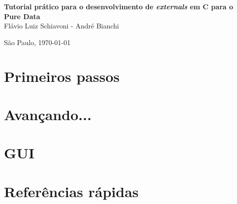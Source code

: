 \documentclass[10pt,a4paper]{report}
\newcommand{\externals}{\emph{externals}\xspace}
\begin{document}
\thispagestyle{empty}
\begin{center}
    \vspace*{2.3cm}
    \vskip 8cm
    \textbf{\Large{Tutorial prático para o desenvolvimento de \externals em C para o
Pure Data}}\\

    \vspace*{1.2cm}
    \vskip 5cm
    \Large{Flávio Luiz Schiavoni - André Bianchi}

    \vskip 5cm

    \vskip 0.5cm
    \normalsize{São Paulo, \today}
\end{center}

\tableofcontents

\part{Primeiros passos}






\part{Avançando...}


%
\part{GUI}




%
\part{Referências rápidas}

\end{document}
